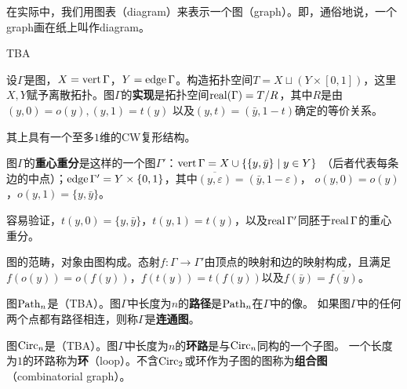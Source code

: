 在实际中，我们用图表（diagram）来表示一个图（graph）。即，通俗地说，一个graph画在纸上叫作diagram。
\begin{example}
    TBA
\end{example}
\begin{definition}
设$\Gamma$是图，$X = \operatorname{vert} \Gamma$，$Y = \operatorname{edge} \Gamma$。构造拓扑空间$T = X \sqcup (Y \times [0,1])$，这里
$X,Y$赋予离散拓扑。图$\Gamma$的\textbf{实现}是拓扑空间$\operatorname{real}(\Gamma) = T/R$，其中$R$是由$(y,0) = o(y),(y,1) = t(y)$
以及$(y,t) = (\bar{y},1-t)$确定的等价关系。
\end{definition}
\begin{remark}
    其上具有一个至多$1$维的CW复形结构。
\end{remark}
\begin{definition}
    图$\Gamma$的\textbf{重心重分}是这样的一个图$\Gamma'$：$\operatorname{vert} \Gamma = X \cup \left\{ \{y,\bar{y}\} \mid y \in Y\right\}$
    （后者代表每条边的中点）；$\operatorname{edge} \Gamma' = Y \times \{0,1\}$，其中$\overline{(y,\varepsilon)} = (\bar{y},1-\varepsilon)$，
    $o(y,0) = o(y)$，$o(y,1) = \{y,\bar{y}\}$。
\end{definition}
容易验证，$t(y,0) = \{y,\bar{y}\}$，$t(y,1) = t(y)$，以及$\operatorname{real} \Gamma'$同胚于$\operatorname{real} \Gamma$的重心重分。
\begin{definition}
    图的范畴，对象由图构成。态射$f:\Gamma \to \Gamma'$由顶点的映射和边的映射构成，且满足
    $f(o(y)) = o(f(y))$，$f(t(y)) = t(f(y))$以及$f(\bar{y}) = \overline{f(y)}$。
\end{definition}
\begin{definition}
    图$\operatorname{Path}_n$是（TBA）。图$\Gamma$中长度为$n$的\textbf{路径}是$\operatorname{Path}_n$在$\Gamma$中的像。
    如果图$\Gamma$中的任何两个点都有路径相连，则称$\Gamma$是\textbf{连通图}。
\end{definition}
\begin{definition}
    图$\operatorname{Circ}_n$是（TBA）。图$\Gamma$中长度为$n$的\textbf{环路}是与$\operatorname{Circ}_n$同构的一个子图。
    一个长度为$1$的环路称为\textbf{环}（loop）。不含$\operatorname{Circ}_2$或环作为子图的图称为\textbf{组合图}（combinatorial graph）。
\end{definition}
